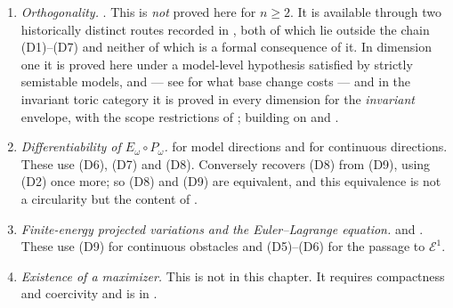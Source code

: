 \begin{enumerate}
\item[\textup{(D8)}]
\emph{Orthogonality.}  .  This is
\emph{not} proved here for $n\geq2$.  It is available through two
historically distinct routes recorded in
, both of which lie outside the chain
\textup{(D1)}--\textup{(D7)} and neither of which is a formal consequence of
it.  In dimension one it is proved here under a model-level hypothesis satisfied
by strictly semistable models,  and
 --- see
 for what base change costs --- and in the
invariant toric category it is proved in every dimension for the
\emph{invariant} envelope,  with the
scope restrictions of ; building on
 and
.
\item[\textup{(D9)}]
\emph{Differentiability of $E_\omega\circ P_\omega$.}
 for model directions and
 for continuous directions.
These use \textup{(D6)}, \textup{(D7)} and \textup{(D8)}.  Conversely
 recovers \textup{(D8)} from
\textup{(D9)}, using \textup{(D2)} once more; so \textup{(D8)} and
\textup{(D9)} are equivalent, and this equivalence is not a circularity but
the content of .
\item[\textup{(D10)}]
\emph{Finite-energy projected variations and the Euler--Lagrange equation.}
 and .  These
use \textup{(D9)} for continuous obstacles and \textup{(D5)}--\textup{(D6)}
for the passage to $\mathcal E^1$.
\item[\textup{(D11)}]
\emph{Existence of a maximizer.}  This is not in this chapter.  It requires
compactness and coercivity and is
 in .
\end{enumerate}


